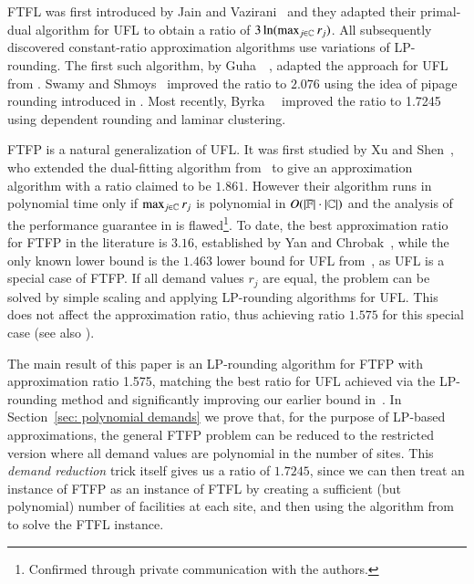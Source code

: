 FTFL was first introduced by Jain and
Vazirani~\cite{JainV03} and they adapted their primal-dual
algorithm for UFL to obtain a ratio of
$3\ln(\max_{j\in\mathbb{C}}r_j)$.  All subsequently
discovered constant-ratio approximation algorithms use
variations of LP-rounding.  The first such algorithm, by
Guha~{\etal}~\cite{GuhaMM01}, adapted the approach for UFL
from \cite{ShmoysTA97}.  Swamy and Shmoys~\cite{SwamyS08}
improved the ratio to $2.076$ using the idea of pipage
rounding introduced in \cite{Svi02}. Most recently,
Byrka~{\etal}~\cite{ByrkaSS10} improved the ratio to 1.7245
using dependent rounding and laminar clustering.

FTFP is a natural generalization of UFL. It was first
studied by Xu and Shen~\cite{XuS09}, who extended the
dual-fitting algorithm from~\cite{JainMMSV03} to give an
approximation algorithm with a ratio claimed to be
$1.861$. However their algorithm runs in polynomial time
only if $\max_{j\in\mathbb{C}} r_j$ is polynomial in
$O(|\mathbb{F}|\cdot |\mathbb{C}|)$ and the analysis of the
performance guarantee in \cite{XuS09} is
flawed\footnote{Confirmed through private communication with
  the authors.}.  To date, the best approximation ratio for
FTFP in the literature is $3.16$, established by Yan and
Chrobak~\cite{YanC11}, while the only known lower bound is
the $1.463$ lower bound for UFL from~\cite{GuhaK98}, as UFL
is a special case of FTFP.  If all demand values $r_j$ are
equal, the problem can be solved by simple scaling and
applying LP-rounding algorithms for UFL. This does not
affect the approximation ratio, thus achieving ratio $1.575$
for this special case (see also \cite{LiaoShen11}).

\smallskip

The main result of this paper is an LP-rounding algorithm
for FTFP with approximation ratio 1.575, matching the best
ratio for UFL achieved via the LP-rounding method
\cite{ByrkaGS10} and significantly improving our earlier
bound in~\cite{YanC11}. In Section~\ref{sec: polynomial
  demands} we prove that, for the purpose of LP-based
approximations, the general FTFP problem can be reduced to
the restricted version where all demand values are
polynomial in the number of sites.  This \emph{demand
  reduction} trick itself gives us a ratio of $1.7245$,
since we can then treat an instance of FTFP as an instance
of FTFL by creating a sufficient (but polynomial) number of
facilities at each site, and then using the algorithm
from~\cite{ByrkaSS10} to solve the FTFL instance.

